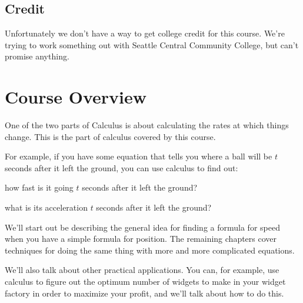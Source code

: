 \documentclass[fleqn, onecolumn]{article}
\begin{document}
  \subsection{Credit}
  Unfortunately we don't have a way to get college credit for this course.
  We're trying to work something out with Seattle Central Community College,
  but can't promise anything.

  \section{Course Overview}
  One of the two parts of Calculus is about calculating the rates at which
  things change. This is the part of calculus covered by this course.

  For example, if you have some equation that tells you where a ball will be $t$
  seconds after it left the ground, you can use calculus to find out:
  \begin{itemize*}
    \item how fast is it going $t$ seconds after it left the ground?
    \item what is its acceleration $t$ seconds after it left the ground?
  \end{itemize*}

  We'll start out be describing the general idea for finding a formula for speed
  when you have a simple formula for position. The remaining chapters cover
  techniques for doing the same thing with more and more complicated equations.

  We'll also talk about other practical applications. You can, for example, use
  calculus to figure out the optimum number of widgets to make in your widget
  factory in order to maximize your profit, and we'll talk about how to do this.
\end{document}
